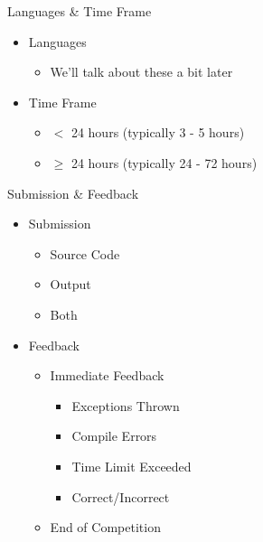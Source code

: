 \documentclass{beamer}
\begin{document}
\begin{frame}{Languages \& Time Frame}
  \begin{centering}
    \begin{itemize}
      \item Languages
      \begin{itemize}
        \item We'll talk about these a bit later
      \end{itemize}
      \pause
      \item Time Frame
      \begin{itemize}
        \item $<$ 24 hours (typically 3 - 5 hours)
        \item $\ge$ 24 hours (typically 24 - 72 hours)
      \end{itemize}
    \end{itemize}
  \end{centering}
\end{frame}

\begin{frame}{Submission \& Feedback}
  \begin{centering}
    \begin{itemize}
      \item Submission
      \begin{itemize}
        \item Source Code
        \item Output
        \item Both
      \end{itemize}
      \pause
      \item Feedback
      \begin{itemize}
        \item Immediate Feedback
        \begin{itemize}
          \item Exceptions Thrown
          \item Compile Errors
          \item Time Limit Exceeded
          \item Correct/Incorrect
        \end{itemize}
        \item End of Competition
      \end{itemize}
    \end{itemize}
  \end{centering}
\end{frame}
\end{document}
